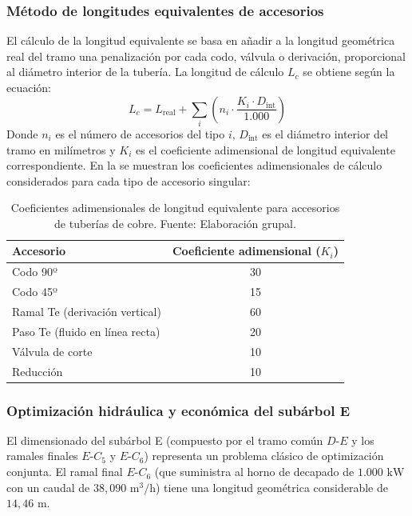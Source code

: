 \documentclass[12pt]{article}
\begin{document}
        \subsubsection{Método de longitudes equivalentes de accesorios}
        El cálculo de la longitud equivalente se basa en añadir a la longitud geométrica real del tramo una penalización por cada codo, válvula o derivación, proporcional al diámetro interior de la tubería. La longitud de cálculo $L_c$ se obtiene según la ecuación:
        \begin{equation}
            L_c = L_{\text{real}} + \sum_{i} \left( n_i \cdot \frac{K_i \cdot D_{\text{int}}}{1.000} \right)
        \end{equation}
        Donde $n_i$ es el número de accesorios del tipo $i$, $D_{\text{int}}$ es el diámetro interior del tramo en milímetros y $K_i$ es el coeficiente adimensional de longitud equivalente correspondiente. En la  se muestran los coeficientes adimensionales de cálculo considerados para cada tipo de accesorio singular:

        \begin{table}[H]
            \centering
            \caption{Coeficientes adimensionales de longitud equivalente para accesorios de tuberías de cobre. Fuente: Elaboración grupal.}
            \label{tab:coeficientes_accesorios}
            \begin{tabular}{lc}
                \toprule
                \textbf{Accesorio} & \textbf{Coeficiente adimensional ($K_i$)} \\
                \midrule
                Codo 90º & 30 \\
                Codo 45º & 15 \\
                Ramal Te (derivación vertical) & 60 \\
                Paso Te (fluido en línea recta) & 20 \\
                Válvula de corte & 10 \\
                Reducción & 10 \\
                \bottomrule
            \end{tabular}
        \end{table}

        \subsubsection{Optimización hidráulica y económica del subárbol E}
        El dimensionado del subárbol E (compuesto por el tramo común $D$-$E$ y los ramales finales $E$-$C_5$ y $E$-$C_6$) representa un problema clásico de optimización conjunta. El ramal final $E$-$C_6$ (que suministra al horno de decapado de $1.000\text{ kW}$ con un caudal de $38,090\text{ m}^3\text{/h}$) tiene una longitud geométrica considerable de $14,46\text{ m}$.
        
\end{document}
